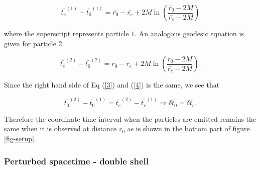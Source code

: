 \documentclass[aps,showpacs,twocolumn,floats,prd,superscriptaddress,nofootinbib]{revtex4-1}
\begin{document}
\begin{equation}
	\bar{t_e}^{(1)} - \bar{t_0}^{(1)} = \bar{r_0} - \bar{r_e} + 2M \ln \left( \frac{\bar{r_0} - 2M}{\bar{r_e} - 2M}  \right)	\label{3}
\end{equation}

where the superscript represents particle $1$. An analogous geodesic equation is given for particle 2. 

\begin{equation}
	\bar{t_e}^{(2)} - \bar{t_0}^{(2)} = \bar{r_0} - \bar{r_e} + 2M \ln \left( \frac{\bar{r_0} - 2M}{\bar{r_e} - 2M}  \right).	\label{4}
\end{equation}

Since the right hand side of Eq (\ref{3}) and (\ref{4}) is the same, we see that

\begin{equation}
	\bar{t_0}^{(2)} - \bar{t_0}^{(1)} = \bar{t_e}^{(2)} - \bar{t_e}^{(1)} \Rightarrow \delta \bar{t_0} = \delta \bar{t_e}.
\end{equation}

Therefore the coordinate time interval when the particles are emitted remains the same when it is observed at distance $r_0$ as is shown in the bottom part of figure \ref{fig-setup}.

%
%

\subsubsection{Perturbed spacetime - double shell}
\end{document}
